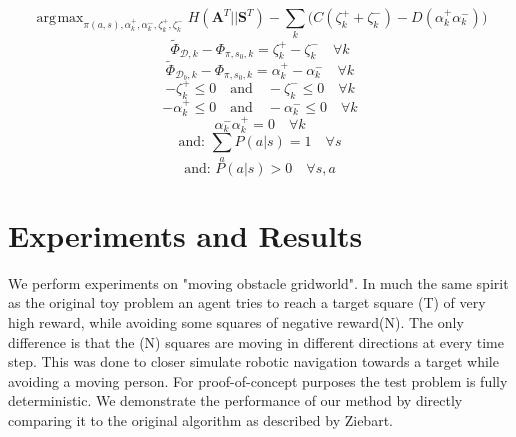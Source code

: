 \documentclass[conference]{IEEEtran}
\DeclareMathOperator*{\argmax}{\arg\!\max}
\begin{document}
	\begin{equation}
	\argmax_{\pi(a,s),\alpha^+_k ,\alpha^-_k ,\zeta^+_k, \zeta^-_k} H(\mathbf{A}^T||\mathbf{S}^T) - \sum_k\big(C(\zeta^+_k + \zeta^-_k)  -D(\alpha^+_k  \alpha^-_k)\big)
\end{equation}
\begin{equation}
	\widetilde{\Phi}_{\mathcal{D},k}-\Phi_{\pi,s_0,k}   = \zeta^+_k  - \zeta^-_k \quad \forall k \label{eq:good_ineq}
\end{equation}
\begin{equation}
	\widetilde{\Phi}_{\mathcal{D}_b,k}-\Phi_{\pi,s_0,k}  = \alpha^+_k-\alpha^-_k \quad \forall k \label{eq:bad_ineq}
\end{equation}
\begin{equation}
	-\zeta^+_k \leq 0 \quad \text{and} \quad -\zeta^-_k \leq 0 \quad \forall k
\end{equation}
\begin{equation}
	-\alpha^+_k \leq 0 \quad \text{and} \quad -\alpha^-_k \leq 0 \quad \forall k
\end{equation}
\begin{equation}
	\alpha^-_k \alpha^+_k = 0 \quad \forall k  \label{eq:quadratic}
\end{equation}
\begin{equation}
	\text{and:   }\sum_aP(a|s)  = 1 \quad \forall s  
\end{equation}
\begin{equation}
	\text{and:   }P(a|s)  > 0 \quad \forall s,a  
\end{equation}


\section{Experiments and Results}
We perform experiments on "moving obstacle gridworld". In much the same spirit as the original toy problem an agent tries to reach a target square (T) of very high reward,
while avoiding some squares of negative reward(N). The only difference is that the (N)  squares are moving in different directions at every time step. This was done to closer simulate robotic navigation towards a target while avoiding a moving person. For proof-of-concept purposes the test problem is fully deterministic. We demonstrate the performance of our method by directly comparing it to the original algorithm as described by Ziebart. \\
%
\end{document}
